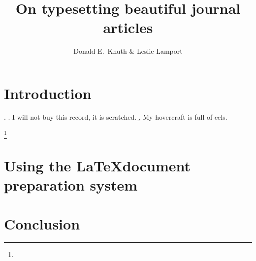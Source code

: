 \documentclass[startpage=1,last]{jciartcl}
\author{Donald E.\ Knuth \& Leslie Lamport}
\title{On typesetting beautiful journal articles}
\begin{document}
\maketitle

\begin{abstract}
\blindtext
\end{abstract}


\section{Introduction}\label{sec:intro}

\blindtext

\ex.
	\a. I will not buy this record, it is scratched.
	\b. My hovercraft is full of eels.


\blindtext\footnote{\blindtext}


\section{Using the \LaTeX document preparation system}\label{sec:latex}

\Blindtext


\section{Conclusion}\label{sec:concl}

\blindtext


\nocite{*}


\end{document}
